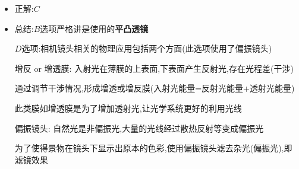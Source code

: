 \documentclass{article}
\begin{document}
\begin{itemize}
    \item 正解:\quad $C$
    \item 总结:\quad $B$选项严格讲是使用的\textbf{平凸透镜}  
    
    \hspace{3.2em}$D$选项:相机镜头相关的物理应用包括两个方面(此选项使用了偏振镜头)

    \hspace{3.2em}增反 or 增透膜: 入射光在薄膜的上表面,下表面产生反射光,存在光程差(干涉)

    \hspace{10.4em}通过调节干涉情况,形成增透或增反膜(入射光能量=反射光能量+透射光能量)

    \hspace{10.4em}此类膜如增透膜是为了增加透射光,让光学系统更好的利用光线

    \hspace{3.2em}偏振镜头: 自然光是非偏振光,大量的光线经过散热反射等变成偏振光

    \hspace{8em}为了使得景物在镜头下显示出原本的色彩,使用偏振镜头滤去杂光(偏振光),即滤镜效果
\end{itemize}

\vspace{2em}
\end{document}
